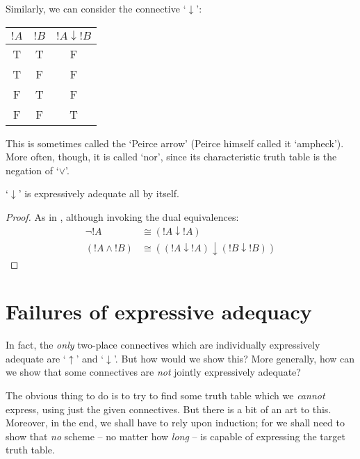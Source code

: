 \documentclass[../../../include/open-logic-section]{subfiles}
\begin{document}
Similarly, we can consider the connective `$\downarrow$':
\begin{center}
\begin{tabular}{c c | c}
${!A}$ & ${!B}$ & ${!A} \mathrel{\downarrow} {!B}$\\
\hline
 T & T & F \\
 T & F & F  \\
 F & T & F  \\
 F & F & T
\end{tabular}
\end{center}
This is sometimes called the `Peirce arrow' (Peirce himself called it `ampheck'). More often, though, it is called `nor', since its characteristic truth table is the negation of `$\lor$'.
	\begin{prop}
	`$\downarrow$' is expressively adequate all by itself. 
	\begin{proof}
	As in , although invoking the dual equivalences:
		\begin{align*}
			\lnot {!A} &\cong ({!A} \downarrow {!A})\\
			({!A} \land {!B}) & \cong (({!A} \downarrow {!A}) \downarrow ({!B} \downarrow {!B}))
		\end{align*}
	\end{proof}
\end{prop}

\section{Failures of expressive adequacy}
 In fact, the \emph{only} two-place connectives which are individually expressively adequate are `$\uparrow$' and `$\downarrow$'. But how would we show this? More generally, how can we show that some connectives are \emph{not} jointly expressively adequate? 
 
The obvious thing to do is to try to find some truth table which we \emph{cannot} express, using just the given connectives. But there is a bit of an art to this. Moreover, in the end, we shall have to rely upon induction; for we shall need to show that \emph{no} scheme -- no matter how \emph{long} -- is capable of expressing the target truth table. 
 
\end{document}
